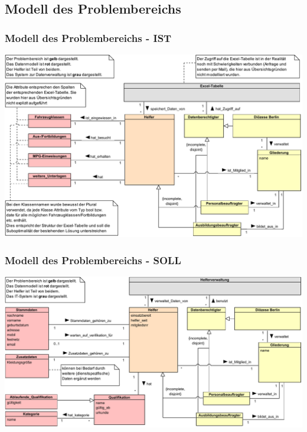 \documentclass{beamer}
\begin{document}
\subsection{Modell des Problembereichs}		
\begin{frame}
\frametitle{Modell des Problembereichs - IST}
\includegraphics[height=0.75\textheight]{PDF/Klassendiagramm_ist.pdf}
\end{frame}
\begin{frame}
\frametitle{Modell des Problembereichs - SOLL}
\includegraphics[width=\textwidth]{PDF/Klassendiagramm_soll.pdf}
\end{frame}
\end{document}

